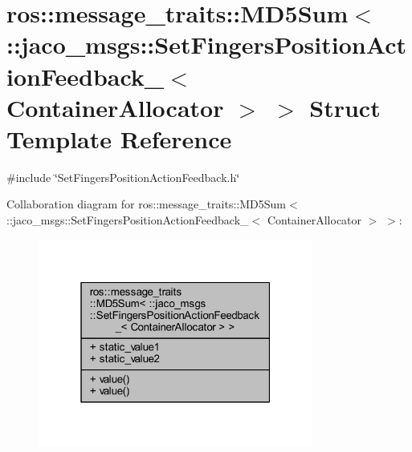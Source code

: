 \hypertarget{structros_1_1message__traits_1_1MD5Sum_3_01_1_1jaco__msgs_1_1SetFingersPositionActionFeedback___dfd49ff210ac61d84c4dc5e7681b49fc}{}\section{ros\+:\+:message\+\_\+traits\+:\+:M\+D5\+Sum$<$ \+:\+:jaco\+\_\+msgs\+:\+:Set\+Fingers\+Position\+Action\+Feedback\+\_\+$<$ Container\+Allocator $>$ $>$ Struct Template Reference}
\label{structros_1_1message__traits_1_1MD5Sum_3_01_1_1jaco__msgs_1_1SetFingersPositionActionFeedback___dfd49ff210ac61d84c4dc5e7681b49fc}


{\ttfamily \#include \char`\"{}Set\+Fingers\+Position\+Action\+Feedback.\+h\char`\"{}}



Collaboration diagram for ros\+:\+:message\+\_\+traits\+:\+:M\+D5\+Sum$<$ \+:\+:jaco\+\_\+msgs\+:\+:Set\+Fingers\+Position\+Action\+Feedback\+\_\+$<$ Container\+Allocator $>$ $>$\+:
\nopagebreak
\begin{figure}[H]
\begin{center}
\leavevmode
\includegraphics[width=256pt]{dd/d27/structros_1_1message__traits_1_1MD5Sum_3_01_1_1jaco__msgs_1_1SetFingersPositionActionFeedback___ccd699d9f81b060bacc064224ad4d2af}
\end{center}
\end{figure}
